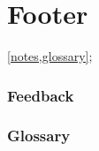 \newpage
\part{Footer}
\cref{notes,glossary};

\newpage
\section{Feedback}
\label{feedback}


\newpage
\section{Glossary}
\label{glossary}
\printglossaries